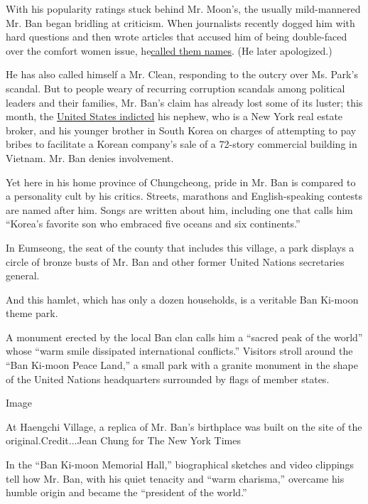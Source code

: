 With his popularity ratings stuck behind Mr. Moon's, the usually
mild-mannered Mr. Ban began bridling at criticism. When journalists
recently dogged him with hard questions and then wrote articles that
accused him of being double-faced over the comfort women issue,
he\href{http://tv.naver.com/v/1388672}{called them names}. (He later
apologized.)

He has also called himself a Mr. Clean, responding to the outcry over
Ms. Park's scandal. But to people weary of recurring corruption scandals
among political leaders and their families, Mr. Ban's claim has already
lost some of its luster; this month, the
\href{https://www.justice.gov/usao-sdny/pr/four-individuals-charged-foreign-bribery-and-fraud-scheme-involving-potential-800}{United
States indicted} his nephew, who is a New York real estate broker, and
his younger brother in South Korea on charges of attempting to pay
bribes to facilitate a Korean company's sale of a 72-story commercial
building in Vietnam. Mr. Ban denies involvement.

Yet here in his home province of Chungcheong, pride in Mr. Ban is
compared to a personality cult by his critics. Streets, marathons and
English-speaking contests are named after him. Songs are written about
him, including one that calls him ``Korea's favorite son who embraced
five oceans and six continents.''

In Eumseong, the seat of the county that includes this village, a park
displays a circle of bronze busts of Mr. Ban and other former United
Nations secretaries general.

And this hamlet, which has only a dozen households, is a veritable Ban
Ki-moon theme park.

A monument erected by the local Ban clan calls him a ``sacred peak of
the world'' whose ``warm smile dissipated international conflicts.''
Visitors stroll around the ``Ban Ki-moon Peace Land,'' a small park with
a granite monument in the shape of the United Nations headquarters
surrounded by flags of member states.

Image

At Haengchi Village, a replica of Mr. Ban's birthplace was built on the
site of the original.Credit...Jean Chung for The New York Times

In the ``Ban Ki-moon Memorial Hall,'' biographical sketches and video
clippings tell how Mr. Ban, with his quiet tenacity and ``warm
charisma,'' overcame his humble origin and became the ``president of the
world.''

